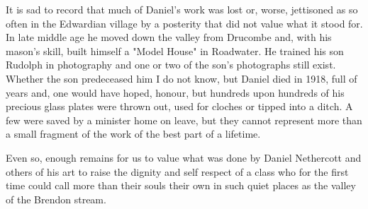 It is sad to record that much of Daniel's work was lost or, worse, jettisoned as so often in the Edwardian village by a posterity that did not value what it stood for. In late middle age he moved down the valley from Drucombe and, with his mason's skill, built himself a "Model House" in Roadwater. He trained his son Rudolph in photography and one or two of the son's photographs still exist. Whether the son predeceased him I do not know, but Daniel died in 1918, full of years and, one would have hoped, honour, but hundreds upon hundreds of his precious glass plates were thrown out, used for cloches or tipped into a ditch. A few were saved by a minister home on leave, but they cannot represent more than a small fragment of the work of the best part of a lifetime.

Even so, enough remains for us to value what was done by Daniel Nethercott and others of his art to raise the dignity and self respect of a class who for the first time could call more than their souls their own in such quiet places as the valley of the Brendon stream.